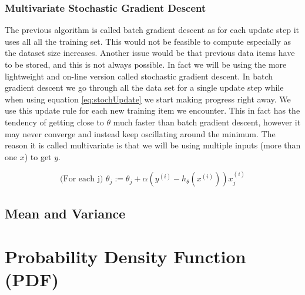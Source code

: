 \documentclass{mproj}
\begin{document}
\subsubsection{Multivariate Stochastic Gradient Descent}
The previous algorithm is called batch gradient descent as for each update step it uses all all the training set. This would not be feasible to compute especially as the dataset size increases. Another issue would be that previous data items have to be stored, and this is not always possible. In fact we will be using the more lightweight and on-line version called stochastic gradient descent. In batch gradient descent we go through all the data set for a single update step while when using equation \ref{eq:stochUpdate} we start making progress right away. We use this update rule for each new training item we encounter. This in fact has the tendency of getting close to $\theta$ much faster than batch gradient descent, however it may never converge and instead keep oscillating around the minimum. The reason it is called multivariate is that we will be using multiple inputs (more than one $x$) to get $y$.

\begin{equation}
\label{eq:stochUpdate}
\text{(For each j) }\theta_j := \theta_j + \alpha(y^{(i)}-h_\theta(x^{(i)}))x_j^{(i)}
\end{equation}

\subsection{Mean and Variance}
\label{sec:meanvariance}

\section{Probability Density Function (PDF)}
\label{sec:pdf}
\end{document}
